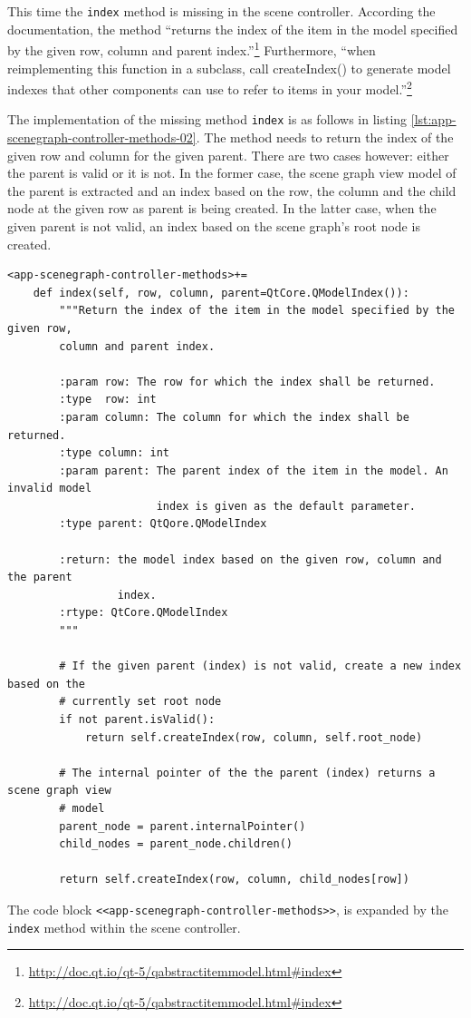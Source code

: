 \documentclass[10pt, openright, notitlepage]{scrreprt}
\begin{document}
This time the \texttt{index} method is missing in the scene controller.
According the documentation, the method ``returns the index of the item in the
model specified by the given row, column and parent
index.''\footnote{\url{http://doc.qt.io/qt-5/qabstractitemmodel.html\#index}}
Furthermore, ``when reimplementing this function in a subclass, call
createIndex() to generate model indexes that other components can use to refer
to items in your
model.''\footnote{\url{http://doc.qt.io/qt-5/qabstractitemmodel.html\#index}}

The implementation of the missing method \texttt{index} is as follows in
listing \ref{lst:app-scenegraph-controller-methods-02}. The method needs to return the
index of the given row and column for the given parent. There are two cases
however: either the parent is valid or it is not. In the former case, the scene
graph view model of the parent is extracted and an index based on the row, the
column and the child node at the given row as parent is being created. In the
latter case, when the given parent is not valid, an index based on the scene
graph's root node is created.

\begin{listing}[H]
\begin{verbatim}
<app-scenegraph-controller-methods>+=
    def index(self, row, column, parent=QtCore.QModelIndex()):
        """Return the index of the item in the model specified by the given row,
        column and parent index.
    
        :param row: The row for which the index shall be returned.
        :type  row: int
        :param column: The column for which the index shall be returned.
        :type column: int
        :param parent: The parent index of the item in the model. An invalid model
                       index is given as the default parameter.
        :type parent: QtQore.QModelIndex
    
        :return: the model index based on the given row, column and the parent
                 index.
        :rtype: QtCore.QModelIndex
        """
    
        # If the given parent (index) is not valid, create a new index based on the
        # currently set root node
        if not parent.isValid():
            return self.createIndex(row, column, self.root_node)
    
        # The internal pointer of the the parent (index) returns a scene graph view
        # model
        parent_node = parent.internalPointer()
        child_nodes = parent_node.children()
    
        return self.createIndex(row, column, child_nodes[row])
\end{verbatim}
\caption{\label{lst:app-scenegraph-controller-methods-02}
The code block \texttt{<<app-scenegraph-controller-methods>>}, is expanded by the \texttt{index} method within the scene controller.}
\end{listing}
\end{document}
